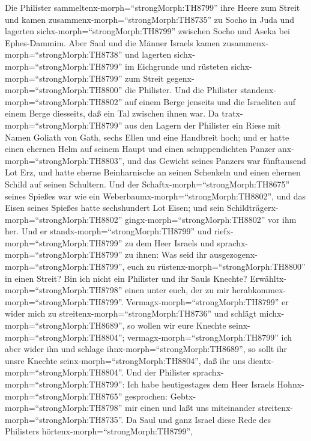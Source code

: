  Die Philister sammeltenx-morph=``strongMorph:TH8799'' ihre
Heere zum Streit und kamen zusammenx-morph=``strongMorph:TH8735'' zu
Socho in Juda und lagerten sichx-morph=``strongMorph:TH8799'' zwischen
Socho und Aseka bei Ephes-Dammim.  Aber Saul und die Männer
Israels kamen zusammenx-morph=``strongMorph:TH8738'' und lagerten
sichx-morph=``strongMorph:TH8799'' im Eichgrunde und rüsteten
sichx-morph=``strongMorph:TH8799'' zum Streit
gegenx-morph=``strongMorph:TH8800'' die Philister.  Und die
Philister standenx-morph=``strongMorph:TH8802'' auf einem Berge jenseits
und die Israeliten auf einem Berge diesseits, daß ein Tal zwischen ihnen
war.  Da tratx-morph=``strongMorph:TH8799'' aus den Lagern
der Philister ein Riese mit Namen Goliath von Gath, sechs Ellen und eine
Handbreit hoch;  und er hatte einen ehernen Helm auf seinem
Haupt und einen schuppendichten Panzer anx-morph=``strongMorph:TH8803'',
und das Gewicht seines Panzers war fünftausend Lot Erz,  und
hatte eherne Beinharnische an seinen Schenkeln und einen ehernen Schild
auf seinen Schultern.  Und der
Schaftx-morph=``strongMorph:TH8675'' seines Spießes war wie ein
Weberbaumx-morph=``strongMorph:TH8802'', und das Eisen seines Spießes
hatte sechshundert Lot Eisen; und sein
Schildträgerx-morph=``strongMorph:TH8802''
gingx-morph=``strongMorph:TH8802'' vor ihm her.  Und er
standx-morph=``strongMorph:TH8799'' und
riefx-morph=``strongMorph:TH8799'' zu dem Heer Israels und
sprachx-morph=``strongMorph:TH8799'' zu ihnen: Was seid ihr
ausgezogenx-morph=``strongMorph:TH8799'', euch zu
rüstenx-morph=``strongMorph:TH8800'' in einen Streit? Bin ich nicht ein
Philister und ihr Sauls Knechte? Erwähltx-morph=``strongMorph:TH8798''
einen unter euch, der zu mir herabkommex-morph=``strongMorph:TH8799''.
 Vermagx-morph=``strongMorph:TH8799'' er wider mich zu
streitenx-morph=``strongMorph:TH8736'' und schlägt
michx-morph=``strongMorph:TH8689'', so wollen wir eure Knechte
seinx-morph=``strongMorph:TH8804''; vermagx-morph=``strongMorph:TH8799''
ich aber wider ihn und schlage ihnx-morph=``strongMorph:TH8689'', so
sollt ihr unsre Knechte seinx-morph=``strongMorph:TH8804'', daß ihr uns
dientx-morph=``strongMorph:TH8804''.  Und der Philister
sprachx-morph=``strongMorph:TH8799'': Ich habe heutigestages dem Heer
Israels Hohnx-morph=``strongMorph:TH8765'' gesprochen:
Gebtx-morph=``strongMorph:TH8798'' mir einen und laßt uns miteinander
streitenx-morph=``strongMorph:TH8735''.  Da Saul und ganz
Israel diese Rede des Philisters hörtenx-morph=``strongMorph:TH8799'',
